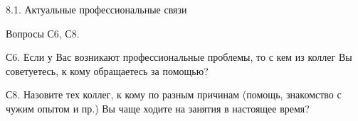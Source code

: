 \begin{frame}{8.1. Актуальные профессиональные связи }

Вопросы С6, С8.

С6. Если у Вас возникают профессиональные проблемы, то с кем из коллег Вы советуетесь, к кому обращаетесь за помощью?

С8. Назовите тех коллег, к кому по разным причинам (помощь, знакомство с чужим опытом и пр.) Вы чаще ходите на занятия в настоящее время?

\end{frame}


